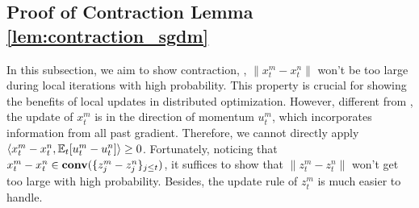\documentclass{article} %
\numberwithin{equation}{section}
\begin{document}
\subsection{Proof of Contraction Lemma \ref{lem:contraction_sgdm}}

    In this subsection, we aim to show contraction, \ie, $\|x_t^m-x_t^n\|$ won't be too large during local iterations with high probability. 
    This property is crucial for showing the benefits of local updates in distributed optimization. 
    However, different from \citep{woodworth2020local,khaled2020tighter}, the update of $x_t^m$ is in the direction of momentum $u_t^m$, which incorporates information from all past gradient. 
    Therefore, we cannot directly apply $\left\langle x_t^m-x_t^n, \mathbb{E}_t[u_t^m-u_t^n]\right\rangle \geq 0$. 
    Fortunately, noticing that $x_t^m-x_t^n\in \mbox{\bf conv}(\{z_j^m-z_j^n\}_{j\leq t})$, it suffices to show that $\|z_t^m-z_t^n\|$ won't get too large with high probability. 
    Besides, the update rule of $z_t^m$ is much easier to handle.
    
\end{document}
